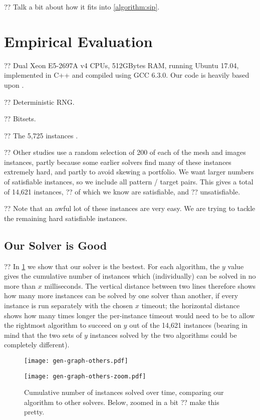 \documentclass{article}
\newcommand{\citet}[1]{\citeauthor{#1} \shortcite{#1}}
\newcommand{\citep}[1]{\cite{#1}}
\begin{document}
?? Talk a bit about how it fits into \cref{algorithm:sip}.

\section{Empirical Evaluation}

?? Dual Xeon E5-2697A v4 CPUs, 512GBytes RAM, running Ubuntu 17.04, implemented in C++ and compiled
using GCC 6.3.0. Our code is heavily based upon \citet{dblp:conf/cp/McCreeshP15}.

?? Deterministic RNG.

?? Bitsets.

?? The 5,725 instances \citep{dblp:conf/lion/KotthoffMS16}.

?? Other studies use a random selection of 200 of each of the mesh and images instances, partly
because some earlier solvers find many of these instances extremely hard, and partly to avoid
skewing a portfolio. We want larger numbers of satisfiable instances, so we include all pattern /
target pairs. This gives a total of 14,621 instances, ?? of which we know are satisfiable, and ??
unsatisfiable.

?? Note that an awful lot of these instances are very easy. We are trying to tackle the remaining
hard satisfiable instances.

\subsection{Our Solver is Good}

?? In \cref{figure:others} we show that our solver is the bestest. For each algorithm, the $y$ value
gives the cumulative number of instances which (individually) can be solved in no more than $x$
milliseconds.  The vertical distance between two lines therefore shows how many more instances can
be solved by one solver than another, if every instance is run separately with the chosen $x$
timeout; the horizontal distance shows how many times longer the per-instance timeout would need to
be to allow the rightmost algorithm to succeed on $y$ out of the 14,621 instances (bearing in mind
that the two sets of $y$ instances solved by the two algorithms could be completely different).

\begin{figure}[tb]
    \centering
    \texttt{[image: gen-graph-others.pdf]}

    \centering
    \texttt{[image: gen-graph-others-zoom.pdf]}

    \caption{Cumulative number of instances solved over time, comparing our algorithm to other
    solvers. Below, zoomed in a bit ?? make this pretty.}
    \label{figure:others}
\end{figure}
\end{document}
